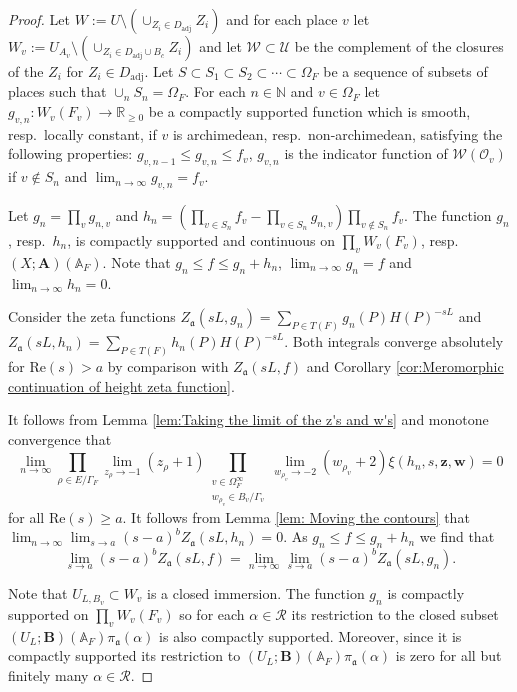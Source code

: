 \documentclass[a4paper,11pt,reqno]{amsart}
\newcommand{\N}{\mathbb{N}}\newcommand{\Z}{\mathbb{Z}}
\newcommand{\R}{\mathbb{R}}
\newcommand{\A}{\mathbb{A}}
\DeclareMathOperator{\adj}{adj}
\renewcommand{\Re}{\mathrm{Re}}
\theoremstyle{definition}
\begin{document}
\begin{proof}
	Let $W := U \setminus \left( \cup_{Z_i \in D_{\adj}} Z_i\right)$ and for each place $v$ let $W_v := U_{A_v} \setminus \left( \cup_{Z_i \in D_{\adj} \cup B_c} Z_i\right)$ and let $\mathcal{W} \subset \mathcal{U}$ be the complement of the closures of the $Z_i$ for $Z_i \in D_{\adj}$. Let $S \subset S_1 \subset S_2 \subset \cdots \subset \Omega_F$ be a sequence of subsets of places such that $\cup_{n} S_n = \Omega_F$. For each $n \in \N$ and $v \in \Omega_F$ let $g_{v, n}: W_v(F_v) \to \R_{\geq 0}$ be a compactly supported function which is smooth, resp.~locally constant, if $v$ is archimedean, resp.~non-archimedean, satisfying the following properties: $g_{v, n-1} \leq g_{v,n} \leq f_v$, $g_{v, n}$ is the indicator function of $\mathcal{W}(\mathcal{O}_v)$ if $v \not \in S_n$ and $\lim_{n \to \infty} g_{v,n} = f_v$.
	
	Let $g_n = \prod_v g_{n,v}$ and $h_n = \left(\prod_{v \in S_n} f_v - \prod_{v \in S_n} g_{n, v}\right) \prod_{v \not \in S_n} f_v$. The function $g_n$, resp.~$h_n$, is compactly supported and continuous on $\prod_v W_v(F_v)$, resp.~$(X ; \mathbf{A})(\A_F)$. Note that $g_n \leq f \leq g_n + h_n$, $\lim_{n \to \infty} g_n = f$ and $\lim_{n \to \infty} h_n = 0$.
	
	Consider the zeta functions $Z_{\mathfrak{a}}(s L, g_n) = \sum_{P \in T(F)} g_n(P) H(P)^{-s L}$ and $Z_{\mathfrak{a}}(s L, h_n) = \sum_{P \in T(F)} h_n(P) H(P)^{-s L}$. Both integrals converge absolutely for $\Re(s) > a$ by comparison with $Z_{\mathfrak{a}}(s L, f)$ and Corollary \ref{cor:Meromorphic continuation of height zeta function}. 
	
	 It follows from Lemma \ref{lem:Taking the limit of the z's and w's} and monotone convergence that
	 \[
	 \lim_{n \to \infty} \prod_{\rho \in E / \Gamma_F} \lim_{z_{\rho} \to -1}(z_{\rho} + 1) \prod_{\substack{v \in \Omega_{F}^{\infty} \\ w_{\rho_v} \in B_v / \Gamma_v}} \lim_{w_{\rho_v} \to - 2}(w_{\rho_v} + 2) \xi(h_n, s, \bm{z}, \bm{w}) = 0
	 \]
	 for all $\Re(s) \geq a$. It follows from Lemma \ref{lem: Moving the contours} that $\lim_{n \to \infty} \lim_{s \to a} (s - a)^b Z_{\mathfrak{a}}(s L, h_n) = 0$. As $g_n \leq f \leq g_n + h_n$ we find that \[
	 \lim_{s \to a} (s - a)^b Z_{\mathfrak{a}}(s L, f) = \lim_{n \to \infty} \lim_{s \to a} (s - a)^bZ_{\mathfrak{a}}(s L, g_n).
	 \]
	 
	
	Note that $U_{L, B_v} \subset W_v$ is a closed immersion. The function $g_n$ is compactly supported on $\prod_v W_v(F_v)$ so for each $\alpha \in \mathcal{R}$ its restriction to the closed subset $(U_L ; \mathbf{B})(\A_F) \pi_{\mathfrak{a}}(\alpha)$ is also compactly supported. Moreover, since it is compactly supported its restriction to $(U_L ; \mathbf{B})(\A_F) \pi_{\mathfrak{a}}(\alpha)$ is zero for all but finitely many $\alpha \in \mathcal{R}$. 
	

\end{proof}
\end{document}

